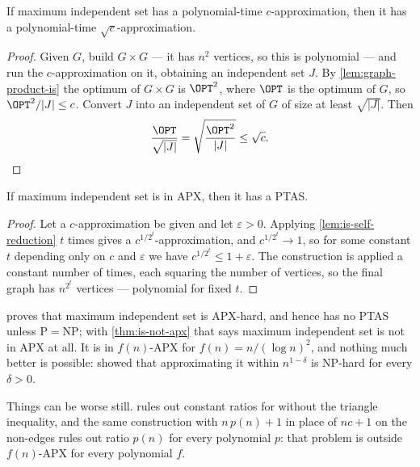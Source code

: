 \begin{lemma}\label{lem:is-self-reduction}
If maximum independent set has a polynomial-time $c$-approximation, then it has
a polynomial-time $\sqrt{c}$-approximation.
\end{lemma}

\begin{proof}
Given $G$, build $G \times G$ --- it has $n^2$ vertices, so this is polynomial
--- and run the $c$-approximation on it, obtaining an independent set $J$. By
\cref{lem:graph-product-is} the optimum of $G \times G$ is $\OPT^2$, where
$\OPT$ is the optimum of $G$, so $\OPT^2 / |J| \le c$. Convert $J$ into an
independent set of $G$ of size at least $\sqrt{|J|}$. Then
\[ \frac{\OPT}{\sqrt{|J|}} = \sqrt{\frac{\OPT^2}{|J|}} \le \sqrt{c}. \qedhere \]
\end{proof}

\begin{theorem}\label{thm:is-not-apx}
If maximum independent set is in \textrm{APX}, then it has a PTAS.
\end{theorem}

\begin{proof}
Let a $c$-approximation be given and let $\varepsilon > 0$. Applying
\cref{lem:is-self-reduction} $t$ times gives a $c^{1/2^t}$-approximation, and
$c^{1/2^t} \to 1$, so for some constant $t$ depending only on $c$ and
$\varepsilon$ we have $c^{1/2^t} \le 1+\varepsilon$. The construction is applied
a constant number of times, each squaring the number of vertices, so the final
graph has $n^{2^t}$ vertices --- polynomial for fixed $t$.
\end{proof}

 proves that maximum independent set is \textrm{APX}-hard, and
hence has no PTAS unless $\mathrm{P} = \mathrm{NP}$; with
\cref{thm:is-not-apx} that says maximum independent set is not in \textrm{APX}
at all. It is in $f(n)$-APX for $f(n) = n/(\log n)^2$, and nothing much better
is possible: \citet{Zuckerman2007} showed that approximating it within
$n^{1-\delta}$ is \textrm{NP}-hard for every $\delta > 0$.

Things can be worse still.  rules out constant ratios
for  without the triangle inequality, and the same construction with
$n\,p(n) + 1$ in place of $nc + 1$ on the non-edges rules out ratio $p(n)$ for
every polynomial $p$: that problem is outside $f(n)$-APX for every polynomial
$f$.

